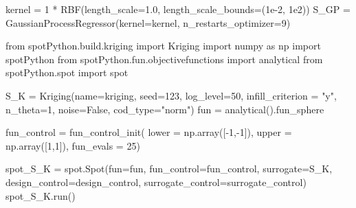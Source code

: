 \documentclass[
  letterpaper,
  DIV=11,
  numbers=noendperiod]{scrreprt}
\newenvironment{Shaded}{\begin{snugshade}}{\end{snugshade}}
\newcommand{\DecValTok}[1]{\textcolor[rgb]{0.68,0.00,0.00}{#1}}
\newcommand{\FloatTok}[1]{\textcolor[rgb]{0.68,0.00,0.00}{#1}}
\newcommand{\ImportTok}[1]{\textcolor[rgb]{0.00,0.46,0.62}{#1}}
\newcommand{\NormalTok}[1]{\textcolor[rgb]{0.00,0.23,0.31}{#1}}
\newcommand{\OperatorTok}[1]{\textcolor[rgb]{0.37,0.37,0.37}{#1}}
\newcommand{\StringTok}[1]{\textcolor[rgb]{0.13,0.47,0.30}{#1}}
\newcommand{\VariableTok}[1]{\textcolor[rgb]{0.07,0.07,0.07}{#1}}
\begin{document}
\begin{Shaded}
\begin{Highlighting}[]
\NormalTok{kernel }\OperatorTok{=} \DecValTok{1} \OperatorTok{*}\NormalTok{ RBF(length\_scale}\OperatorTok{=}\FloatTok{1.0}\NormalTok{, length\_scale\_bounds}\OperatorTok{=}\NormalTok{(}\FloatTok{1e{-}2}\NormalTok{, }\FloatTok{1e2}\NormalTok{))}
\NormalTok{S\_GP }\OperatorTok{=}\NormalTok{ GaussianProcessRegressor(kernel}\OperatorTok{=}\NormalTok{kernel, n\_restarts\_optimizer}\OperatorTok{=}\DecValTok{9}\NormalTok{)}
\end{Highlighting}
\end{Shaded}

\begin{Shaded}
\begin{Highlighting}[]
\ImportTok{from}\NormalTok{ spotPython.build.kriging }\ImportTok{import}\NormalTok{ Kriging}
\ImportTok{import}\NormalTok{ numpy }\ImportTok{as}\NormalTok{ np}
\ImportTok{import}\NormalTok{ spotPython}
\ImportTok{from}\NormalTok{ spotPython.fun.objectivefunctions }\ImportTok{import}\NormalTok{ analytical}
\ImportTok{from}\NormalTok{ spotPython.spot }\ImportTok{import}\NormalTok{ spot}

\NormalTok{S\_K }\OperatorTok{=}\NormalTok{ Kriging(name}\OperatorTok{=}\StringTok{\textquotesingle{}kriging\textquotesingle{}}\NormalTok{,}
\NormalTok{              seed}\OperatorTok{=}\DecValTok{123}\NormalTok{,}
\NormalTok{              log\_level}\OperatorTok{=}\DecValTok{50}\NormalTok{,}
\NormalTok{              infill\_criterion }\OperatorTok{=} \StringTok{"y"}\NormalTok{,}
\NormalTok{              n\_theta}\OperatorTok{=}\DecValTok{1}\NormalTok{,}
\NormalTok{              noise}\OperatorTok{=}\VariableTok{False}\NormalTok{,}
\NormalTok{              cod\_type}\OperatorTok{=}\StringTok{"norm"}\NormalTok{)}
\NormalTok{fun }\OperatorTok{=}\NormalTok{ analytical().fun\_sphere}

\NormalTok{fun\_control }\OperatorTok{=}\NormalTok{ fun\_control\_init(}
\NormalTok{    lower }\OperatorTok{=}\NormalTok{ np.array([}\OperatorTok{{-}}\DecValTok{1}\NormalTok{,}\OperatorTok{{-}}\DecValTok{1}\NormalTok{]),}
\NormalTok{    upper }\OperatorTok{=}\NormalTok{ np.array([}\DecValTok{1}\NormalTok{,}\DecValTok{1}\NormalTok{]),}
\NormalTok{    fun\_evals }\OperatorTok{=} \DecValTok{25}\NormalTok{)}

\NormalTok{spot\_S\_K }\OperatorTok{=}\NormalTok{ spot.Spot(fun}\OperatorTok{=}\NormalTok{fun,}
\NormalTok{                     fun\_control}\OperatorTok{=}\NormalTok{fun\_control,}
\NormalTok{                     surrogate}\OperatorTok{=}\NormalTok{S\_K,}
\NormalTok{                     design\_control}\OperatorTok{=}\NormalTok{design\_control,}
\NormalTok{                     surrogate\_control}\OperatorTok{=}\NormalTok{surrogate\_control)}
\NormalTok{spot\_S\_K.run()}
\end{Highlighting}
\end{Shaded}
\end{document}
